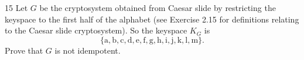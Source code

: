\documentclass[11pt]{article}
\begin{document}
\begin{exercise}{15}
    Let $G$ be the cryptosystem obtained from Caesar slide by
    restricting the keyspace to the first half of the alphabet (see
    Exercise 2.15 for definitions relating to the Caesar slide
    cryptosystem). So the keyspace $K_G$ is
    \[
        \{\mathrm{a,b,c,d,e,f,g,h,i,j,k,l,m}\}.
    \]
    Prove that $G$ is not idempotent.
\end{exercise}
\begin{solution}

\end{solution}
\end{document}
